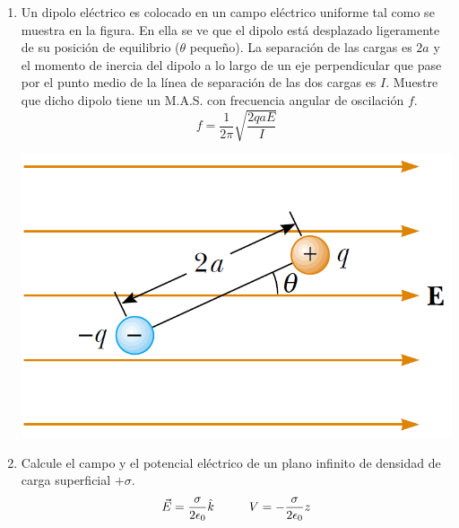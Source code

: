 \documentclass[11pt,twocolumn]{article}
\begin{document}
\begin{enumerate}
\item Un dipolo eléctrico es colocado en un campo eléctrico uniforme tal como se muestra en la figura. En ella se ve que el dipolo está desplazado ligeramente de su posición de equilibrio ($\theta$ pequeño). La separación de las cargas es $2a$ y el momento de inercia del dipolo a lo largo de un eje perpendicular que pase por el punto medio de la línea de separación de las dos cargas es $I$. Muestre que dicho dipolo tiene un M.A.S. con frecuencia angular de oscilación $f$.
\begin{displaymath}
f=\dfrac{1}{2\pi}\sqrt{\dfrac{2qaE}{I}}
\end{displaymath}   
{
\begin{center}
\includegraphics[scale=0.2]{MAS-dipolo}
\end{center}
}

\item Calcule el campo y el potencial eléctrico de un plano infinito de densidad de carga superficial $+\sigma$.
\begin{displaymath}
\vec{E}=\dfrac{\sigma}{2\epsilon_{0}}\hat{k} \hspace{1.0 cm} V=-\dfrac{\sigma}{2\epsilon_{0}}z
\end{displaymath}


\end{enumerate}
\end{document}
